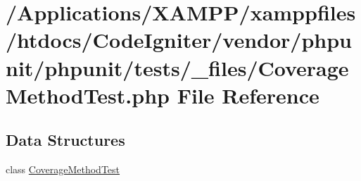 \hypertarget{phpunit_2tests_2__files_2_coverage_method_test_8php}{}\section{/\+Applications/\+X\+A\+M\+P\+P/xamppfiles/htdocs/\+Code\+Igniter/vendor/phpunit/phpunit/tests/\+\_\+files/\+Coverage\+Method\+Test.php File Reference}
\label{phpunit_2tests_2__files_2_coverage_method_test_8php}
\subsection*{Data Structures}
\begin{DoxyCompactItemize}
\item 
class \mbox{\hyperlink{class_coverage_method_test}{Coverage\+Method\+Test}}
\end{DoxyCompactItemize}
